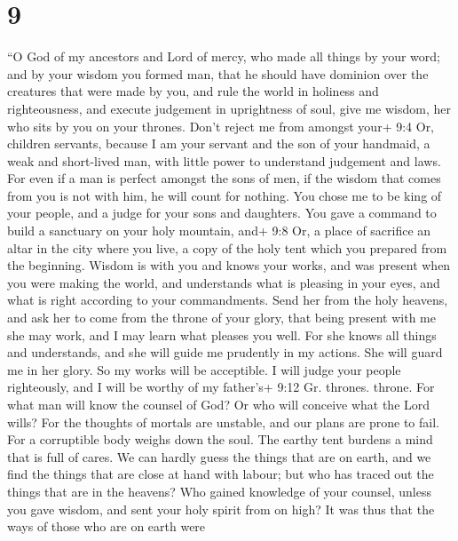 \hypertarget{section-7}{%
\section{9}\label{section-7}}

 ``O God of my ancestors and Lord of mercy, who made all
things by your word;  and by your wisdom you formed man,
that he should have dominion over the creatures that were made by you,
 and rule the world in holiness and righteousness, and
execute judgement in uprightness of soul,  give me wisdom,
her who sits by you on your thrones. Don't reject me from amongst your+
9:4 Or, children servants,  because I am your servant and
the son of your handmaid, a weak and short-lived man, with little power
to understand judgement and laws.  For even if a man is
perfect amongst the sons of men, if the wisdom that comes from you is
not with him, he will count for nothing.  You chose me to be
king of your people, and a judge for your sons and daughters.
 You gave a command to build a sanctuary on your holy
mountain, and+ 9:8 Or, a place of sacrifice an altar in the city where
you live, a copy of the holy tent which you prepared from the beginning.
 Wisdom is with you and knows your works, and was present
when you were making the world, and understands what is pleasing in your
eyes, and what is right according to your commandments. 
Send her from the holy heavens, and ask her to come from the throne of
your glory, that being present with me she may work, and I may learn
what pleases you well.  For she knows all things and
understands, and she will guide me prudently in my actions. She will
guard me in her glory.  So my works will be acceptible. I
will judge your people righteously, and I will be worthy of my father's+
9:12 Gr. thrones. throne.  For what man will know the
counsel of God? Or who will conceive what the Lord wills? 
For the thoughts of mortals are unstable, and our plans are prone to
fail.  For a corruptible body weighs down the soul. The
earthy tent burdens a mind that is full of cares.  We can
hardly guess the things that are on earth, and we find the things that
are close at hand with labour; but who has traced out the things that
are in the heavens?  Who gained knowledge of your counsel,
unless you gave wisdom, and sent your holy spirit from on high?
 It was thus that the ways of those who are on earth were
